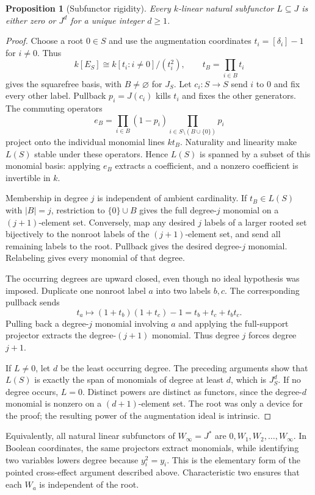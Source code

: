 \documentclass[11pt,a4paper]{article}
\newtheorem{proposition}[theorem]{Proposition}
\theoremstyle{definition}
\theoremstyle{remark}
\begin{document}
\begin{proposition}[Subfunctor rigidity]\label{prop:rigidity}
Every $k$-linear natural subfunctor $L\subseteq J$ is either zero or $J^d$ for a unique integer $d\ge1$.
\end{proposition}
\begin{proof}
Choose a root $0\in S$ and use the augmentation coordinates
$t_i=[\delta_i]-1$ for $i\ne0$. Thus
\[
 k[E_S]\cong k[t_i:i\ne0]/(t_i^2),
 \qquad t_B=\prod_{i\in B}t_i
\]
gives the squarefree basis, with $B\ne\varnothing$ for $J_S$.
Let $c_i:S\to S$ send $i$ to $0$ and fix every other label. Pullback
$p_i=J(c_i)$ kills $t_i$ and fixes the other generators. The commuting
operators
\[
 e_B=\prod_{i\in B}(1-p_i)\prod_{i\in S\setminus(B\cup\{0\})}p_i
\]
project onto the individual monomial lines $k t_B$. Naturality and
linearity make $L(S)$ stable under these operators. Hence $L(S)$ is
spanned by a subset of this monomial basis: applying $e_B$ extracts a
coefficient, and a nonzero coefficient is invertible in $k$.

Membership in degree $j$ is independent of ambient cardinality. If
$t_B\in L(S)$ with $|B|=j$, restriction to $\{0\}\cup B$ gives the full
degree-$j$ monomial on a $(j+1)$-element set. Conversely, map any desired
$j$ labels of a larger rooted set bijectively to the nonroot labels of
the $(j+1)$-element set, and send all remaining labels to the root. Pullback gives
the desired degree-$j$ monomial. Relabeling gives every monomial of
that degree.

The occurring degrees are upward closed, even though no ideal
hypothesis was imposed. Duplicate one nonroot label $a$ into two
labels $b,c$. The corresponding pullback sends
\[
 t_a\longmapsto (1+t_b)(1+t_c)-1=t_b+t_c+t_bt_c.
\]
Pulling back a degree-$j$ monomial involving $a$ and applying the
full-support projector extracts the degree-$(j+1)$ monomial. Thus
degree $j$ forces degree $j+1$.

If $L\ne0$, let $d$ be the least occurring degree. The preceding
arguments show that $L(S)$ is exactly the span of monomials of degree
at least $d$, which is $J_S^d$. If no degree occurs, $L=0$. Distinct
powers are distinct as functors, since the degree-$d$ monomial is
nonzero on a $(d+1)$-element set. The root was only a device for the
proof; the resulting power of the augmentation ideal is intrinsic.
\end{proof}

Equivalently, all natural linear subfunctors of $W_\infty=J^*$ are
$0,W_1,W_2,\ldots,W_\infty$. In Boolean coordinates, the same
projectors extract monomials, while identifying two variables lowers
degree because $y_i^2=y_i$. This is the elementary form of the pointed
cross-effect argument described above. Characteristic two ensures
that each $W_a$ is independent of the root.
\end{document}
